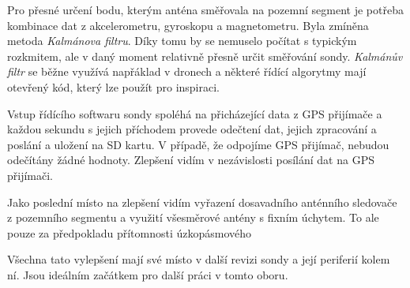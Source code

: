 \documentclass[twoside]{ctuthesis}
\theoremstyle{plain}
\theoremstyle{definition}
\theoremstyle{note}
\begin{document}
	Pro přesné určení bodu, kterým anténa směřovala na pozemní segment je potřeba kombinace dat z akcelerometru, gyroskopu a magnetometru. Byla zmíněna metoda \textit{Kalmánova filtru}. Díky tomu by se nemuselo počítat s typickým rozkmitem, ale v daný moment relativně přesně určit směřování sondy. \textit{Kalmánův filtr} se běžne využívá napřáklad v dronech a některé řídící algorytmy mají otevřený kód, který lze použít pro inspiraci.

	Vstup řídícího softwaru sondy spoléhá na přicházející data z GPS přijímače a každou sekundu s jejich příchodem provede odečtení dat, jejich zpracování a poslání a uložení na SD kartu. V případě, že odpojíme GPS přijímač, nebudou odečítány žádné hodnoty. Zlepšení vidím v nezávislosti posílání dat na GPS přijímači.

	Jako poslední místo na zlepšení vidím vyřazení dosavadního anténního sledovače z pozemního segmentu a využití všesměrové antény s fixním úchytem. To ale pouze za předpokladu přítomnosti úzkopásmového 

	Všechna tato vylepšení mají své místo v další revizi sondy a její periferií kolem ní. Jsou ideálním začátkem pro další práci v tomto oboru.
	
















	


\appendix

\printindex
\end{document}
